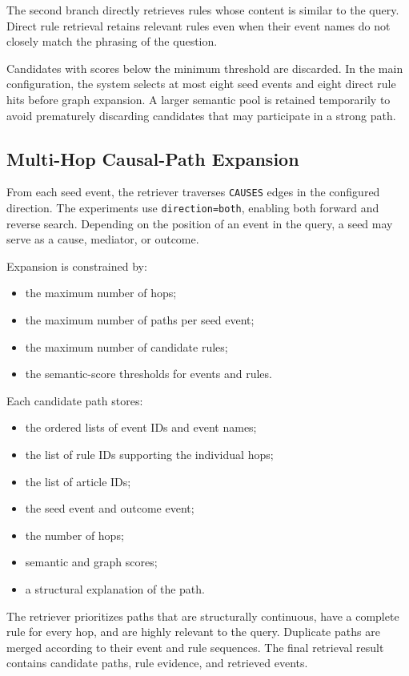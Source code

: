The second branch directly retrieves rules whose content is similar to the
query. Direct rule retrieval retains relevant rules even when their event
names do not closely match the phrasing of the question.

Candidates with scores below the minimum threshold are discarded. In the
main configuration, the system selects at most eight seed events and eight
direct rule hits before graph expansion. A larger semantic pool is retained
temporarily to avoid prematurely discarding candidates that may participate
in a strong path.

\subsection{Multi-Hop Causal-Path Expansion}

From each seed event, the retriever traverses \texttt{CAUSES} edges in the
configured direction. The experiments use \texttt{direction=both}, enabling
both forward and reverse search. Depending on the position of an event in
the query, a seed may serve as a cause, mediator, or outcome.

Expansion is constrained by:

\begin{itemize}
    \item the maximum number of hops;
    \item the maximum number of paths per seed event;
    \item the maximum number of candidate rules;
    \item the semantic-score thresholds for events and rules.
\end{itemize}

Each candidate path stores:

\begin{itemize}
    \item the ordered lists of event IDs and event names;
    \item the list of rule IDs supporting the individual hops;
    \item the list of article IDs;
    \item the seed event and outcome event;
    \item the number of hops;
    \item semantic and graph scores;
    \item a structural explanation of the path.
\end{itemize}

The retriever prioritizes paths that are structurally continuous, have a
complete rule for every hop, and are highly relevant to the query. Duplicate
paths are merged according to their event and rule sequences. The final
retrieval result contains candidate paths, rule evidence, and retrieved
events.

